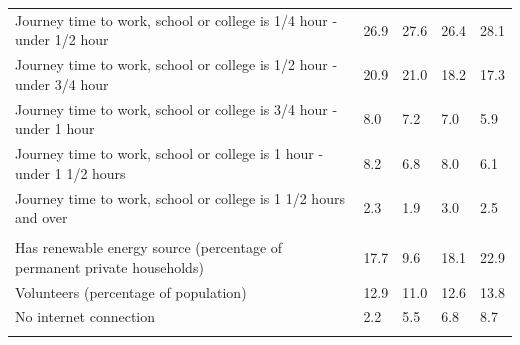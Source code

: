\documentclass{article}
\begin{document}
\begin{table}[h]
\begin{tabular}{KTTTT}
Journey time to work, school or college is 1/4 hour - under 1/2 hour & 26.9& 27.6& 26.4& 28.1\\
Journey time to work, school or college is 1/2 hour - under 3/4 hour & 20.9& 21.0& 18.2& 17.3\\
Journey time to work, school or college is 3/4 hour - under 1 hour & 8.0& 7.2& 7.0& 5.9\\
Journey time to work, school or college is 1 hour - under 1 1/2 hours & 8.2& 6.8& 8.0& 6.1\\
Journey time to work, school or college is 1 1/2 hours and over & 2.3& 1.9& 3.0& 2.5\\
\hline
    \\ 
    \hline
Has renewable energy source (percentage of permanent private households) & 17.7&  9.6& 18.1& 22.9\\
    \hline
Volunteers (percentage of population) & 12.9& 11.0& 12.6& 13.8\\
    \hline
No internet connection& 2.2& 5.5& 6.8& 8.7\\
\hline
\end{tabular}
\end{table}
\end{document}
